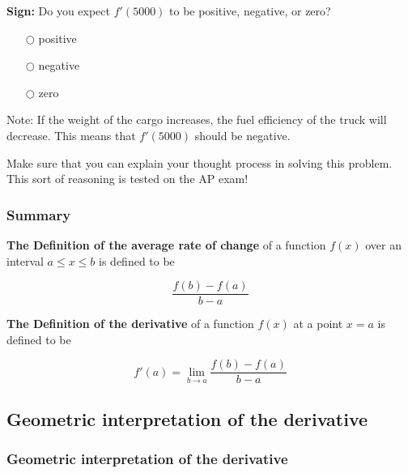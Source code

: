 \documentclass[pdftex, brazil, 12pt, twoside]{article}
\begin{document}
\begin{exercise}
  \textbf{Sign:} Do you expect $f'(5000)$ to be positive, negative, or zero? 
\begin{itemize}[noitemsep]
\item[$\bigcirc$] positive
\item[$\bigcirc$] negative
\item[$\bigcirc$] zero
\end{itemize}
\end{exercise}

Note: If the weight of the cargo increases, the fuel efficiency of the truck will
decrease. This means that $f'(5000)$ should be negative.

Make sure that you can explain your thought process in solving this problem.
This sort of reasoning is tested on the AP exam! 

\subsubsection{Summary}
\label{u1-what-summary}

\textbf{The Definition of the average rate of change} of a function $f(x)$
over an interval $a \le x \le b$ is defined to be

\begin{equation}
  \frac{f(b) - f(a)}{b-a}
\end{equation}

\textbf{The Definition of the derivative} of a function $f(x)$
at a point $x=a$ is defined to be

\begin{equation}
  f'(a) = \lim_{b \to a}\frac{f(b) - f(a)}{b-a}
\end{equation}


\subsection{Geometric interpretation of the derivative}
\label{u1-geometric}

\subsubsection{Geometric interpretation of the derivative}
\label{u1-geometric-interpretation}
\end{document}
